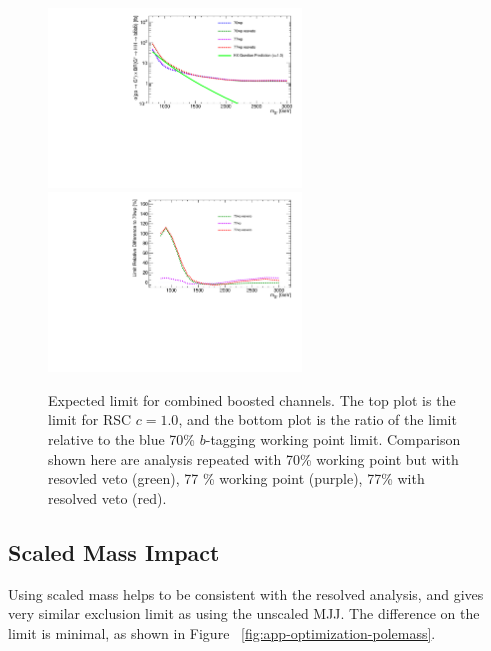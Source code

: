 \begin{figure}[htbp!]
\begin{center}
\includegraphics[width=0.6\textwidth,angle=-90]{figures/boosted/AppendixOptimization/CompareLimits_HH_BoostedNewRun2-resveto_c10.pdf}\\
\includegraphics[width=0.6\textwidth,angle=-90]{figures/boosted/AppendixOptimization/CompareLimits_HH_BoostedNewRun2-resveto_c10_ratio.pdf}
  \caption{Expected limit for combined boosted channels. The top plot is the limit for RSC $c=1.0$, and the bottom plot is the ratio of the limit relative to the blue 70\% $b$-tagging working point limit. Comparison shown here are analysis repeated with 70\% working point but with resovled veto (green), 77 \% working point (purple), 77\% with resolved veto (red).}
  \label{fig:app-optimization-btagging}
\end{center}
\end{figure}


\clearpage
\subsection{Scaled Mass Impact}
\label{sec:app-optimization-polemass}
Using scaled mass helps to be consistent with the resolved analysis, and gives very similar exclusion limit as using the unscaled MJJ. The difference on the limit is minimal, as shown in Figure ~\ref{fig:app-optimization-polemass}.


